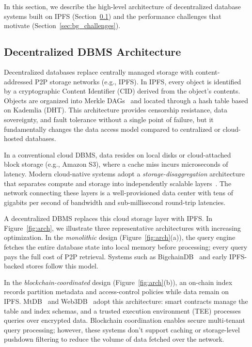 In this section, we describe the high-level architecture of decentralized database systems built on IPFS (Section~\ref{sec:bg_arch}) and the performance challenges that motivate \ours (Section~\ref{sec:bg_challenges}).
 
\subsection{Decentralized DBMS Architecture}
\label{sec:bg_arch}
 
Decentralized databases replace centrally managed storage with content-addressed P2P storage networks (e.g., IPFS). In IPFS, every object is identified by a cryptographic Content Identifier (CID) derived from the object's contents. Objects are organized into Merkle DAGs~\cite{merkle1987digital} and located through a hash table based on Kademlia (DHT)\cite{daniel2022ipfs, trautwein2022design}. This architecture provides censorship resistance, data sovereignty, and fault tolerance without a single point of failure, but it fundamentally changes the data access model compared to centralized or cloud-hosted databases.
 
In a conventional cloud DBMS, data resides on local disks or cloud-attached block storage (e.g., Amazon S3), where a cache miss incurs microseconds of latency. Modern cloud-native systems adopt a \emph{storage-disaggregation} architecture that separates compute and storage into independently scalable layers~\cite{dageville2016snowflake, yang2021flexpushdowndb}. The network connecting these layers is a well-provisioned data center with tens of gigabits per second of bandwidth and sub-millisecond round-trip latencies.
 
A decentralized DBMS replaces this cloud storage layer with IPFS. In Figure~\ref{fig:arch}, we illustrate three representative architectures with increasing optimization. In the \emph{monolithic} design (Figure~\ref{fig:arch}(a)), the query engine fetches the entire database state into local memory before processing; every query pays the full cost of P2P retrieval. Systems such as BigchainDB~\cite{mcconaghy2016bigchaindb} and early IPFS-backed stores follow this model.
 
In the \emph{blockchain-coordinated} design (Figure~\ref{fig:arch}(b)), an on-chain index records partition metadata and access-control policies while data remain on IPFS. MtDB~\cite{hossain2025mtdb} and Web3DB~\cite{mukherjee2025web3db} adopt this architecture: smart contracts manage the table and index schemas, and a trusted execution environment (TEE\cite{}) processes queries over encrypted data. Blockchain coordination enables secure multi-tenant query processing; however, these systems don't support caching or storage-level pushdown filtering to reduce the volume of data fetched over the network.
 
